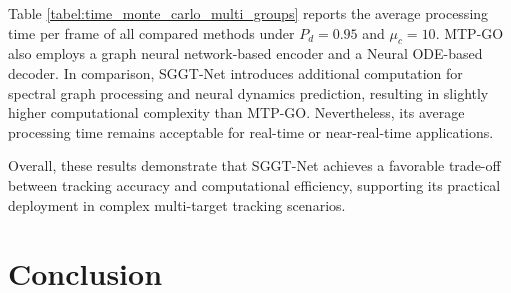 \documentclass[10pt,doublecolumn]{IEEEtaes}
\begin{document}
Table \ref{tabel:time_monte_carlo_multi_groups} reports the average processing time per frame of all compared methods under \(P_d=0.95\) and \(\mu_c=10\). MTP-GO also employs a graph neural network-based encoder and a Neural ODE-based decoder. In comparison, SGGT-Net introduces additional computation for spectral graph processing and neural dynamics prediction, resulting in slightly higher computational complexity than MTP-GO. Nevertheless, its average processing time remains acceptable for real-time or near-real-time applications.

Overall, these results demonstrate that SGGT-Net achieves a favorable trade-off between tracking accuracy and computational efficiency, supporting its practical deployment in complex multi-target tracking scenarios.


\begin{table}[!t]
\centering
\caption{Neural motion-predictor complexity versus target number.}
\label{tab:complexity}
\end{table}


\begin{table}[h!]
	\centering
	\caption{Execution time (ms/frame) of all algorithms with complex group splitting and merging.}
	\label{tabel:time_monte_carlo_multi_groups}
	\normalsize
\end{table}
 

\section{Conclusion}
\end{document}
